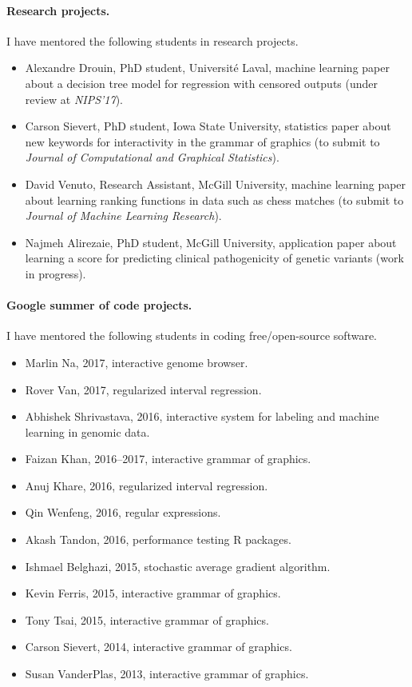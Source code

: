 \documentclass{article}
\begin{document}
\paragraph{Research projects.} I have mentored the following
students in research projects.
\begin{itemize}
\item Alexandre Drouin, PhD student, Universit\'e Laval, machine
  learning paper about a decision tree model for regression with
  censored outputs (under review at \emph{NIPS'17}).
\item Carson Sievert, PhD student, Iowa State University, statistics
  paper about new keywords for interactivity in the grammar of
  graphics (to submit to \emph{Journal of Computational and Graphical
    Statistics}).
\item David Venuto, Research Assistant, McGill University, machine
  learning paper about learning ranking functions in data such as
  chess matches (to submit to \emph{Journal of Machine Learning
    Research}).
\item Najmeh Alirezaie, PhD student, McGill University, application
  paper about learning a score for predicting clinical pathogenicity
  of genetic variants (work in progress).
\end{itemize}

\paragraph{Google summer of code projects.} I have mentored the
following students in coding free/open-source software.
\begin{itemize}
\item Marlin Na, 2017, interactive genome browser.
\item Rover Van, 2017, regularized interval regression.
\item Abhishek Shrivastava, 2016, interactive system for labeling and
  machine learning in genomic data.
\item Faizan Khan, 2016--2017, interactive grammar of graphics.
\item Anuj Khare, 2016, regularized interval regression.
\item Qin Wenfeng, 2016, regular expressions.
\item Akash Tandon, 2016, performance testing R packages.
\item Ishmael Belghazi, 2015, stochastic average gradient algorithm.
\item Kevin Ferris, 2015, interactive grammar of graphics.
\item Tony Tsai, 2015, interactive grammar of graphics.
\item Carson Sievert, 2014, interactive grammar of graphics.
\item Susan VanderPlas, 2013, interactive grammar of graphics.
\end{itemize}
\end{document}
